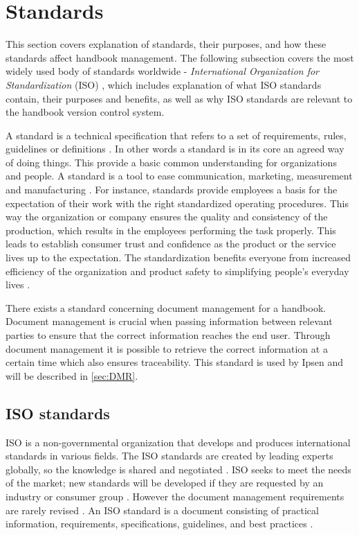 \section{Standards} \label{sec:standards}
This section covers explanation of standards, their purposes, and how these standards affect handbook management.
The following subsection covers the most widely used body of standards worldwide - \textit{International Organization for Standardization} (ISO) \cite{ISOworldwidemostused}, which includes explanation of what ISO standards contain, their purposes and benefits, as well as why ISO standards are relevant to the handbook version control system.

A standard is a technical specification that refers to a set of requirements, rules, guidelines or definitions \citep[p.~5]{Standard}.
In other words a standard is in its core an agreed way of doing things.
This provide a basic common understanding for organizations and people.
A standard is a tool to ease communication, marketing, measurement and manufacturing \cite{Standardtool}.
For instance, standards provide employees a basis for the expectation of their work with the right standardized operating procedures.
This way the organization or company ensures the quality and consistency of the production, which results in the employees performing the task properly.
This leads to establish consumer trust and confidence as the product or the service lives up to the expectation.
The standardization benefits everyone from increased efficiency of the organization and product safety to simplifying people's everyday lives \citep[p.~83]{Standardization}.

There exists a standard concerning document management for a handbook.
Document management is crucial when passing information between relevant parties to ensure that the correct information reaches the end user.
Through document management it is possible to retrieve the correct information at a certain time which also ensures traceability.
This standard is used by Ipsen and will be described in \cref{sec:DMR}.

\subsection{ISO standards} \label{sec:ISOstandards}
ISO is a non-governmental organization that develops and produces international standards in various fields.
The ISO standards are created by leading experts globally, so the knowledge is shared and negotiated \cite{ISOinfo}.
ISO seeks to meet the needs of the market; new standards will be developed if they are requested by an industry or consumer group \cite{ISOdeveloping}.
However the document management requirements are rarely revised \cite{Ipsenfirstinterview}.
An ISO standard is a document consisting of practical information, requirements, specifications, guidelines, and best practices \cite{ISOreviewedevery5years}.

